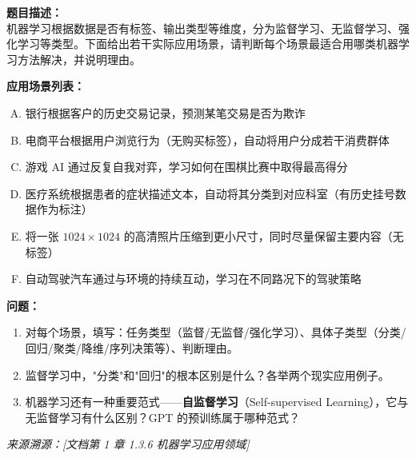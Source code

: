 \documentclass[a4paper,11pt]{ctexart}
\begin{document}
\begin{problembox}
    \textbf{题目描述：}\\
    机器学习根据数据是否有标签、输出类型等维度，分为监督学习、无监督学习、强化学习等类型。下面给出若干实际应用场景，请判断每个场景最适合用哪类机器学习方法解决，并说明理由。

    \vspace{0.2cm}
    \textbf{应用场景列表：}
    \begin{enumerate}[A.]
        \item 银行根据客户的历史交易记录，预测某笔交易是否为欺诈
        \item 电商平台根据用户浏览行为（无购买标签），自动将用户分成若干消费群体
        \item 游戏 AI 通过反复自我对弈，学习如何在围棋比赛中取得最高得分
        \item 医疗系统根据患者的症状描述文本，自动将其分类到对应科室（有历史挂号数据作为标注）
        \item 将一张 $1024\times1024$ 的高清照片压缩到更小尺寸，同时尽量保留主要内容（无标签）
        \item 自动驾驶汽车通过与环境的持续互动，学习在不同路况下的驾驶策略
    \end{enumerate}

    \vspace{0.2cm}
    \textbf{问题：}
    \begin{enumerate}[(1)]
        \item 对每个场景，填写：任务类型（监督/无监督/强化学习）、具体子类型（分类/回归/聚类/降维/序列决策等）、判断理由。
        \item 监督学习中，"分类"和"回归"的根本区别是什么？各举两个现实应用例子。
        \item 机器学习还有一种重要范式——\textbf{自监督学习}（Self-supervised Learning），它与无监督学习有什么区别？GPT 的预训练属于哪种范式？
    \end{enumerate}
    {\color{gray}\small\textit{来源溯源：[文档第 1 章 1.3.6 机器学习应用领域]}}
\end{problembox}
\end{document}
